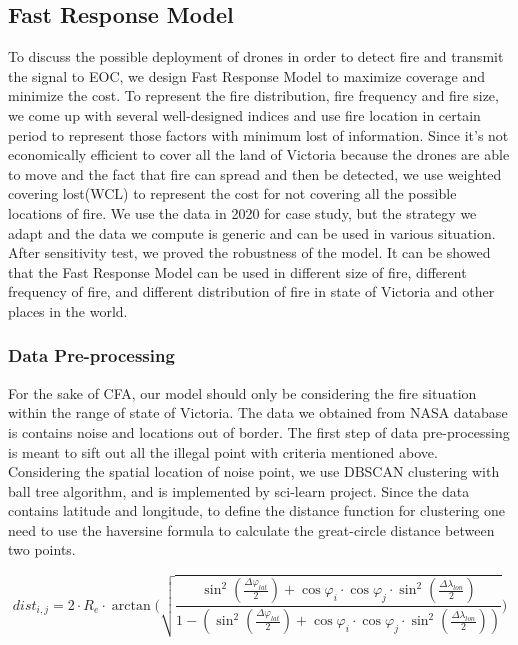 \documentclass[../main]{subfiles}
\begin{document}
\subsection{Fast Response Model}
To discuss the possible deployment of drones in order to detect fire and transmit the signal to EOC,
 we design Fast Response Model to maximize coverage and minimize the cost. To represent the fire distribution,
  fire frequency and fire size, we come up with several well-designed indices and use fire location in certain
   period to represent those factors with minimum lost of information.  Since it's not economically
    efficient to cover all the land of Victoria because the drones are able to move and the fact that fire can
     spread and then be detected, we use weighted covering lost(WCL) to represent the cost for not covering 
     all the possible locations of fire. We use the data in 2020 for case study, but the strategy we adapt and
      the data we compute is generic and can be used in various situation. \\

      After sensitivity test, we proved the robustness of the model. It can be showed that the Fast Response Model can be used in different size of fire, different frequency of fire, and different distribution of fire in state of Victoria and other places in the world.
\subsubsection{Data Pre-processing}
For the sake of CFA, our model should only be considering the fire situation within the range of state of Victoria. The data we obtained from NASA database is contains noise and locations out of border. The first step of data pre-processing is meant to sift out all the illegal point with criteria mentioned above. Considering the spatial location of noise point,
 we use DBSCAN clustering with ball tree \cite{enwiki:1065597644} algorithm, and is implemented by sci-learn 
 project\cite{scikit-learn}. 
 Since the data contains latitude and longitude, 
 to define the distance function for clustering one need to use the haversine formula\cite{haversine} to calculate the great-circle distance between two points.
 
 \begin{equation}
      dist_{i,j}=2\cdot R_{e} \cdot \arctan \Bigg(\sqrt{\frac {\sin^2(\frac {\Delta \varphi_{lat} }{2})+\cos\varphi _i\cdot 
      \cos \varphi _j \cdot \sin^2({ \frac {\Delta \lambda_{lon}} {2} })}
      {1-(\sin^2(\frac {\Delta \varphi_{lat} }{2})+\cos\varphi _i\cdot 
      \cos \varphi _j \cdot \sin^2({ \frac {\Delta \lambda_{lon}} {2} }))}}\Bigg)
\end{equation}
\end{document}
